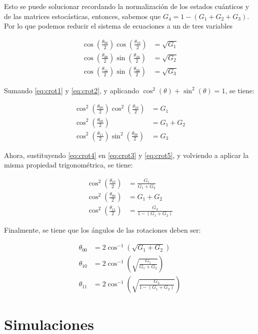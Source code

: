 Esto se puede solucionar recordando la normalización de los estados cuánticos y de las matrices estocásticas, entonces, sabemos que $G_4 = 1 - (G_1 + G_2 + G_3)$. Por lo que podemos reducir el sistema de ecuaciones a un de tres variables

\begin{align}
    \cos(\frac{\theta_{00}}{2}) \cos(\frac{\theta_{10}}{2}) &= \sqrt{G_1}
    \label{eq:crot1} \\
    \cos(\frac{\theta_{00}}{2}) \sin(\frac{\theta_{10}}{2}) &= \sqrt{G_2}
    \label{eq:crot2} \\
    \cos(\frac{\theta_{11}}{2}) \sin(\frac{\theta_{00}}{2}) &= \sqrt{G_3}
\end{align}

Sumando \ref{eq:crot1} y \ref{eq:crot2}, y aplicando $\cos^2(\theta) + \sin^2(\theta) = 1$, se tiene:

\begin{align}
    \cos^2(\frac{\theta_{00}}{2}) \cos^2(\frac{\theta_{10}}{2}) &= G_1
    \label{eq:crot3} \\
    \cos^2(\frac{\theta_{00}}{2}) &= G_1 + G_2
    \label{eq:crot4} \\
    \cos^2(\frac{\theta_{11}}{2}) \sin^2(\frac{\theta_{00}}{2}) &= G_3
    \label{eq:crot5}
\end{align}

Ahora, sustituyendo \ref{eq:crot4} en \ref{eq:crot3} y \ref{eq:crot5}, y volviendo a aplicar la misma propiedad trigonométrica, se tiene:

\begin{align}
    \cos^2(\frac{\theta_{10}}{2}) &= \frac{G_1}{G_1 + G_2} \\
    \cos^2(\frac{\theta_{00}}{2}) &= G_1 + G_2 \\
    \cos^2(\frac{\theta_{11}}{2}) &= \frac{G_3}{1-(G_1 + G_2)}
\end{align}

Finalmente, se tiene que los ángulos de las rotaciones deben ser:

\begin{align}
    \theta_{00} &= 2 \cos^{-1}\left(\sqrt{G_1 + G_2}\right) \\
    \theta_{10} &= 2 \cos^{-1}\left(\sqrt{\frac{G_1}{G_1 + G_2}}\right) \\
    \theta_{11} &= 2 \cos^{-1}\left(\sqrt{\frac{G_3}{1 - (G_1 + G_2)}}\right)
\end{align}

\section{Simulaciones}

